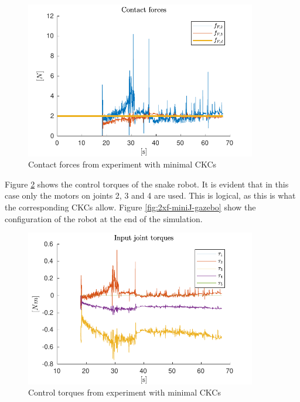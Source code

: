 \begin{figure}
    \centering
    \includegraphics[width=0.9\textwidth]{figures/experiments/2xf/2xf-miniJ-forces.pdf}
    \caption{Contact forces from experiment with minimal CKCs}
    \label{fig:2xf-miniJ-force}
\end{figure}

Figure \ref{fig:2xf-miniJ-torque} shows the control torques of the snake robot. It is evident that in this case only the motors on joints 2, 3 and 4 are used. This is logical, as this is what the corresponding CKCs allow. Figure \ref{fig:2xf-miniJ-gazebo} show the configuration of the robot at the end of the simulation.

\begin{figure}
    \centering
    \includegraphics[width=0.9\textwidth]{figures/experiments/2xf/2xf-miniJ-torques.pdf}
    \caption{Control torques from experiment with minimal CKCs}
    \label{fig:2xf-miniJ-torque}
\end{figure}

